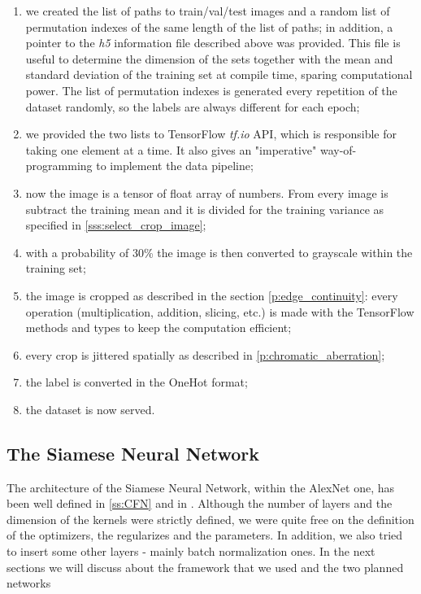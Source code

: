 \begin{enumerate}
    \item we created the list of paths to train/val/test images and a random list of permutation indexes of the same length of the list of paths; in addition, a pointer to the \emph{h5} information file described above was provided. This file is useful to determine the dimension of the sets together with the mean and standard deviation of the training set at compile time, sparing computational power. The list of permutation indexes is generated every repetition of the dataset randomly, so the labels are always different for each epoch;
    \item we provided the two lists to TensorFlow \emph{tf.io} API, which is responsible for taking one element at a time. It also gives an "imperative" way-of-programming to implement the data pipeline;
    \item now the image is a tensor of float array of numbers. From every image is subtract the training mean and it is divided for the training variance as specified in \ref{sss:select_crop_image};
    \item with a probability of 30\% the image is then converted to grayscale within the training set;
    \item the image is cropped as described in the section \ref{p:edge_continuity}: every operation (multiplication, addition, slicing, etc.) is made with the TensorFlow methods and types to keep the computation efficient;
    \item every crop is jittered spatially as described in \ref{p:chromatic_aberration};
    \item the label is converted in the OneHot format;
    \item the dataset is now served.
\end{enumerate}


\subsection{The Siamese Neural Network}\label{ss:siamese}
The architecture of the Siamese Neural Network, within the AlexNet one, has been well defined in \ref{ss:CFN} and in \cite{alexnet_paper}. Although the number of layers and the dimension of the kernels were strictly defined, we were quite free on the definition of the optimizers, the regularizes and the parameters. In addition, we also tried to insert some other layers - mainly batch normalization ones. In the next sections we will discuss about the framework that we used and the two planned networks

